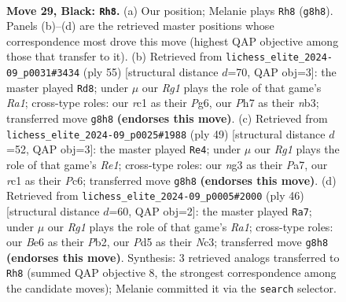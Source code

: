 \documentclass[11pt]{article}
\begin{document}
\clearpage

\begin{figure}[p]\centering
\begin{subfigure}{0.46\textwidth}\centering
\resizebox{\linewidth}{!}{%
\newchessgame
\chessboard[
  setfen={r4kr1/1p3p1p/4b1p1/p2p4/5P2/3K2N1/PP2B1PP/2R4R b - - 0 29},
  showmover=false,
  pgfstyle=straightmove, color=movearrow, markmove={g8-h8}
]}
\caption{}
\end{subfigure}\hfill
\begin{subfigure}{0.46\textwidth}\centering
\resizebox{\linewidth}{!}{%
\newchessgame
\chessboard[
  setfen={r5k1/p4p1p/n1bP2p1/8/3P4/1Np3PP/P4P2/2B2RK1 b - - 0 28},
  showmover=false,
  pgfstyle=straightmove, color=movearrow, markmove={a8-d8}
]}
\caption{}
\end{subfigure}
\\[4pt]
\begin{subfigure}{0.46\textwidth}\centering
\resizebox{\linewidth}{!}{%
\newchessgame
\chessboard[
  setfen={r3r1k1/p4pp1/1pp4p/8/P4P2/2b5/2P2BPP/1R1R1K2 b - - 1 25},
  showmover=false,
  pgfstyle=straightmove, color=movearrow, markmove={e8-e4}
]}
\caption{}
\end{subfigure}\hfill
\begin{subfigure}{0.46\textwidth}\centering
\resizebox{\linewidth}{!}{%
\newchessgame
\chessboard[
  setfen={3r3r/4bp2/2k4p/2n1P1p1/2p5/2N3B1/1P3PPP/R3K2R w KQ - 3 24},
  showmover=false,
  pgfstyle=straightmove, color=movearrow, markmove={a1-a7}
]}
\caption{}
\end{subfigure}
\caption{\textbf{Move 29, Black: \texttt{Rh8}.} (a) Our position; Melanie plays \texttt{Rh8} (\texttt{g8h8}). Panels (b)--(d) are the retrieved master positions whose correspondence most drove this move (highest QAP objective among those that transfer to it). (b) Retrieved from \texttt{lichess\_elite\_2024-09\_p0031\#3434} (ply 55) [structural distance $d$=70, QAP obj=3]: the master played \texttt{Rd8}; under $\mu$ our \emph{Rg1} plays the role of that game's \emph{Ra1}; cross-type roles: our \emph{r}c1 as their \emph{P}g6, our \emph{P}h7 as their \emph{n}b3; transferred move \texttt{g8h8} \textbf{(endorses this move)}. (c) Retrieved from \texttt{lichess\_elite\_2024-09\_p0025\#1988} (ply 49) [structural distance $d$=52, QAP obj=3]: the master played \texttt{Re4}; under $\mu$ our \emph{Rg1} plays the role of that game's \emph{Re1}; cross-type roles: our \emph{n}g3 as their \emph{P}a7, our \emph{r}c1 as their \emph{P}c6; transferred move \texttt{g8h8} \textbf{(endorses this move)}. (d) Retrieved from \texttt{lichess\_elite\_2024-09\_p0005\#2000} (ply 46) [structural distance $d$=60, QAP obj=2]: the master played \texttt{Ra7}; under $\mu$ our \emph{Rg1} plays the role of that game's \emph{Ra1}; cross-type roles: our \emph{B}e6 as their \emph{P}b2, our \emph{P}d5 as their \emph{N}c3; transferred move \texttt{g8h8} \textbf{(endorses this move)}. Synthesis: 3 retrieved analogs transferred to \texttt{Rh8} (summed QAP objective 8, the strongest correspondence among the candidate moves); Melanie committed it via the \texttt{search} selector.}
\label{fig:thought-m57}
\end{figure}
\end{document}
